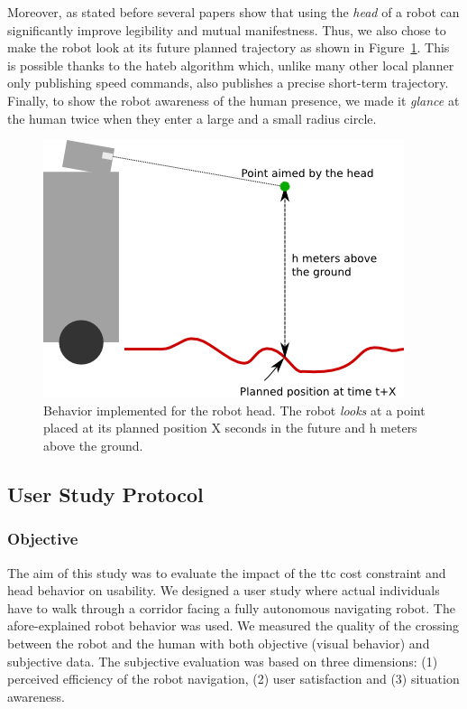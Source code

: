 \documentclass[a4paper,11pt,twoside]{StyleThese}
\begin{document}
Moreover, as stated before several papers show that using the \textit{head} of a robot can significantly improve legibility and mutual manifestness. Thus, we also chose to make the robot look at its future planned trajectory as shown in Figure~\ref{fig:head_gaze_behavior}. This is possible thanks to the \acrshort{hateb} algorithm which, unlike many other local planner only publishing  speed commands, also publishes a precise short-term trajectory. Finally, to show the robot awareness of the human presence, we made it \textit{glance} at the human twice when they enter a large and a small radius circle.

\begin{figure}[hbtp]
\centering
\includegraphics[scale=0.6]{figures/chapter2/head_traj_follower.png}
\caption{Behavior implemented for the robot head. The robot \textit{looks} at a point placed at its planned position X seconds in the future and h meters above the ground.}
\label{fig:head_gaze_behavior}
\end{figure}

\subsection{User Study Protocol}

\subsubsection{Objective}
The aim of this study was to evaluate the impact of the \acrshort{ttc} cost constraint and head behavior on usability. We designed a user study where actual individuals have to walk through a corridor facing a fully autonomous navigating robot. The afore-explained robot behavior was used. We measured the quality of the crossing between the robot and the human with both objective (visual behavior) and subjective data. The subjective evaluation was based on three dimensions: (1) perceived efficiency of the robot navigation, (2) user satisfaction and (3) situation awareness.
\end{document}
